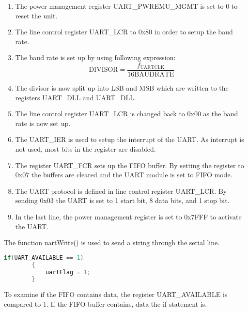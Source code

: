 \begin{enumerate}
\item The power management register UART\_PWREMU\_MGMT is set to 0 to reset the unit.
\item The line control register UART\_LCR to 0x80 in order to setup the baud rate. 
\item The baud rate is set up by using following expression:
\begin{equation}
\text{DIVISOR} = \frac{f_{\text{UARTCLK}}}{16 \text{BAUDRATE}}
\end{equation} 
\item The divisor is now split up into LSB and MSB which are written to the registers UART\_DLL and UART\_DLL.
\item The line control register UART\_LCR is changed back to 0x00 as the baud rate is now set up.
\item The UART\_IER is used to setup the interrupt of the UART. As interrupt is not used, most bits in the register are disabled.
\item The register UART\_FCR sets up the FIFO buffer. By setting the register to 0x07 the buffers are cleared and the UART module is set to FIFO mode.
\item The UART protocol is defined in line control register UART\_LCR. By sending 0x03 the UART is set to 1 start bit, 8 data bits, and 1 stop bit.
\item In the last line, the power management register is set to 0x7FFF to activate the UART.
\end{enumerate}

The function uartWrite() is used to send a string through the serial line.

\begin{lstlisting}[language=C, caption = {Set a flag high if data available in FIFO},label={listingUartFlag}]
    	if(UART_AVAILABLE == 1)
    	{	
			uartFlag = 1;
		}
\end{lstlisting}

To examine if the FIFO contains data, the register UART\_AVAILABLE is compared to 1. If the FIFO buffer contains, data the if statement is.

